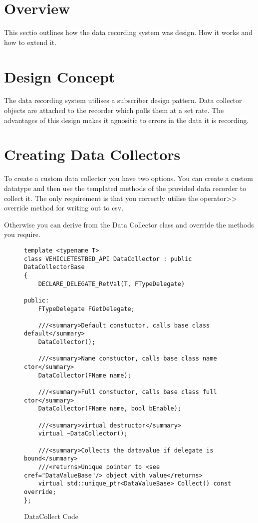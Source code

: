 \documentclass[../main.tex]{subfiles}
\begin{document}
\section{Overview}
This sectio outlines how the data recording system was design. How it works and how to extend it.

\section{Design Concept}
The data recording system utilises a subscriber design pattern. Data collector objects are attached to the recorder which polls them at a set rate. The advantages of this design makes it agnositic to errors in the data it is recording.

\section{Creating Data Collectors}
To create a custom data collector you have two options. You can create a custom datatype and then use the templated methods of the provided data recorder to collect it. The only requirement is that you correctly utilise the operator>> override method for writing out to csv.

Otherwise you can derive from the Data Collector class and override the methods you require.
\begin{figure}[H]
\begin{lstlisting}
template <typename T>
class VEHICLETESTBED_API DataCollector : public DataCollectorBase
{
	DECLARE_DELEGATE_RetVal(T, FTypeDelegate)

public:
	FTypeDelegate FGetDelegate;

	///<summary>Default constuctor, calls base class default</summary>
	DataCollector();

	///<summary>Name constuctor, calls base class name ctor</summary>
	DataCollector(FName name);

	///<summary>Full constuctor, calls base class full ctor</summary>
	DataCollector(FName name, bool bEnable);

	///<summary>virtual destructor</summary>
	virtual ~DataCollector();

	///<summary>Collects the datavalue if delegate is bound</summary>
	///<returns>Unique pointer to <see cref="DataValueBase"/> object with value</returns>
	virtual std::unique_ptr<DataValueBase> Collect() const override;
};
\end{lstlisting}
\caption{DataCollect Code}
\end{figure}
\end{document}
